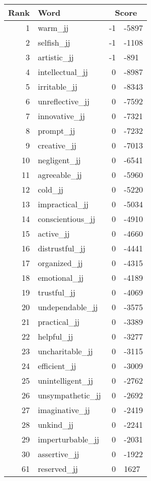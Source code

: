 \begin{longtable}[!htbp]{| rlr@{.}l |}
    \hline
    \textbf{Rank} & \textbf{Word} & \multicolumn{2}{c|}{\textbf{Score}} \\
    \hline
    \endhead
    1 & warm\_jj & -1 & -5897 \\
    2 & selfish\_jj & -1 & -1108 \\
    3 & artistic\_jj & -1 & -891 \\
    4 & intellectual\_jj & 0 & -8987 \\
    5 & irritable\_jj & 0 & -8343 \\
    6 & unreflective\_jj & 0 & -7592 \\
    7 & innovative\_jj & 0 & -7321 \\
    8 & prompt\_jj & 0 & -7232 \\
    9 & creative\_jj & 0 & -7013 \\
    10 & negligent\_jj & 0 & -6541 \\
    11 & agreeable\_jj & 0 & -5960 \\
    12 & cold\_jj & 0 & -5220 \\
    13 & impractical\_jj & 0 & -5034 \\
    14 & conscientious\_jj & 0 & -4910 \\
    15 & active\_jj & 0 & -4660 \\
    16 & distrustful\_jj & 0 & -4441 \\
    17 & organized\_jj & 0 & -4315 \\
    18 & emotional\_jj & 0 & -4189 \\
    19 & trustful\_jj & 0 & -4069 \\
    20 & undependable\_jj & 0 & -3575 \\
    21 & practical\_jj & 0 & -3389 \\
    22 & helpful\_jj & 0 & -3277 \\
    23 & uncharitable\_jj & 0 & -3115 \\
    24 & efficient\_jj & 0 & -3009 \\
    25 & unintelligent\_jj & 0 & -2762 \\
    26 & unsympathetic\_jj & 0 & -2692 \\
    27 & imaginative\_jj & 0 & -2419 \\
    28 & unkind\_jj & 0 & -2241 \\
    29 & imperturbable\_jj & 0 & -2031 \\
    30 & assertive\_jj & 0 & -1922 \\
    61 & reserved\_jj & 0 & 1627 \\

\end{longtable}

